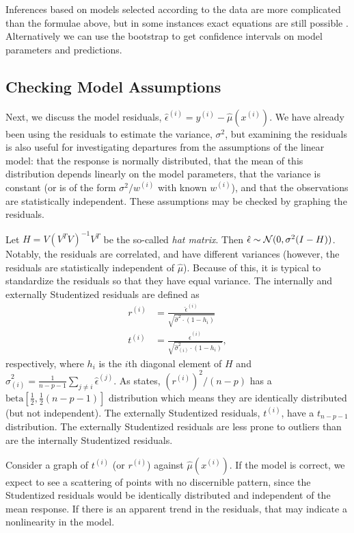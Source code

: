 \documentclass[12pt]{article}
\begin{document}
Inferences based on models selected according to the data are more complicated than the formulae above, but in some instances exact equations are still possible \cite{TTLT:14}. Alternatively we can use the bootstrap \cite[\S 3.3.2]{Hastie:2001} to get confidence intervals on model parameters and predictions.

\subsection{Checking Model Assumptions}
Next, we discuss the model residuals, $\hat{\epsilon}^{(i)} = y^{(i)} - \hat{\mu}(x^{(i)})$. We have already been using the residuals to estimate the variance, $\sigma^2$, but examining the residuals is also useful for investigating departures from the assumptions of the linear model: that the response is normally distributed, that the mean of this distribution depends linearly on the model parameters, that the variance is constant (or is of the form $\sigma^2/w^{(i)}$ with known $w^{(i)}$), and that the observations are statistically independent. These assumptions may be checked by graphing the residuals.

Let $H = V (V^T V)^{-1} V^T$ be the so-called \textit{hat matrix}. Then $\hat{\epsilon} \sim {\mathcal N}(0, \sigma^2 (I - H))$. Notably, the residuals are correlated, and have different variances (however, the residuals are statistically independent of $\hat{\mu}$). Because of this, it is typical to standardize the residuals so that they have equal variance. The internally and externally Studentized residuals are defined as
\begin{align*}
   r^{(i)} &= \frac{\hat{\epsilon}^{(i)}}{\sqrt{\hat{\sigma}^2 \cdot (1 - h_i)}} \\
   t^{(i)} &= \frac{\hat{\epsilon}^{(i)}}{\sqrt{\hat{\sigma}_{(i)}^2 \cdot (1 - h_i)}},
\end{align*}
respectively, where $h_i$ is the $i$th diagonal element of $H$ and $\hat{\sigma}_{(i)}^2 = \frac{1}{n-p-1} \sum_{j \neq i} \hat{\epsilon}^{(j)}$. As \cite[\S~10.2]{Seber:2003} states, $(r^{(i)})^2/(n-p)$ has a $\textrm{beta}[\frac{1}{2}, \frac{1}{2}(n-p-1)]$ distribution which means they are identically distributed (but not independent). The externally Studentized residuals, $t^{(i)}$, have a $t_{n-p-1}$ distribution. The externally Studentized residuals are less prone to outliers than are the internally Studentized residuals.

Consider a graph of $t^{(i)}$ (or $r^{(i)}$) against $\hat{\mu}(x^{(i)})$. If the model is correct, we expect to see a scattering of points with no discernible pattern, since the Studentized residuals would be identically distributed and independent of the mean response. If there is an apparent trend in the residuals, that may indicate a nonlinearity in the model.
\end{document}
